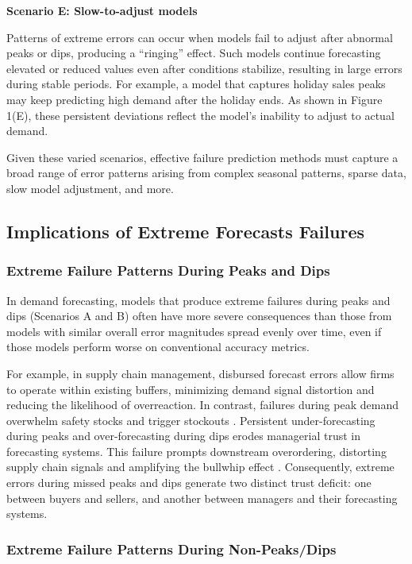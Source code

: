 \documentclass[]{interact}
\theoremstyle{plain}
\theoremstyle{definition}
\theoremstyle{remark}
\newenvironment{scenario}[1]{%
  \par\vspace{1ex}\noindent\textbf{#1}\par\vspace{0.5ex}}{\par}
\begin{document}
\begin{scenario}{Scenario E: Slow-to-adjust models}
Patterns of extreme errors can occur when models fail to adjust after abnormal
peaks or dips, producing a ``ringing'' effect. Such models continue forecasting elevated or reduced values even after conditions stabilize, resulting in large errors during stable periods. For example, a model that captures holiday sales peaks may keep predicting high demand after the holiday ends. As shown in Figure 1(E), these persistent deviations reflect the model's inability to adjust to actual demand.
\end{scenario}

Given these varied scenarios, effective failure prediction methods must capture a broad range of error patterns arising from complex seasonal patterns, sparse data, slow model adjustment, and more.

\subsection{Implications of Extreme Forecasts Failures}

\subsubsection{Extreme Failure Patterns During Peaks and Dips}

In demand forecasting, models that produce extreme failures during peaks and dips (Scenarios A and B) often have more severe consequences than those from models with similar overall error magnitudes spread evenly over time, even if those models perform worse on conventional accuracy metrics.

For example, in supply chain management, disbursed forecast errors allow firms to operate within existing buffers, minimizing demand signal distortion and reducing the likelihood of overreaction. In contrast, failures during peak demand overwhelm safety stocks and trigger stockouts \citep{bray2019}. Persistent under-forecasting during peaks and over-forecasting during dips erodes managerial trust in forecasting systems. This failure prompts downstream overordering, distorting supply chain signals and amplifying the bullwhip effect \citep{croson2014, wu2006}. Consequently, extreme errors during missed peaks and dips generate two distinct trust deficit: one between buyers and sellers, and another between managers and their forecasting systems.

\subsubsection{Extreme Failure Patterns During Non-Peaks/Dips}
\end{document}
